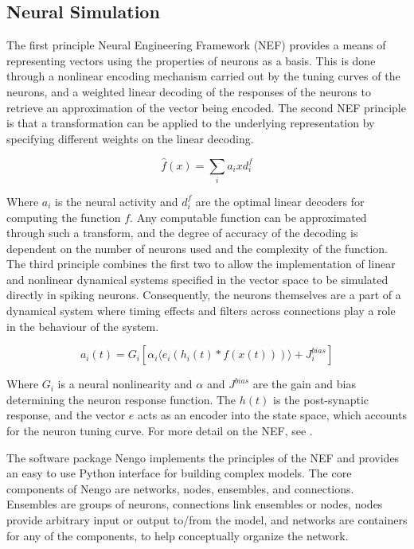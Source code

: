 \documentclass[letterpaper, 10 pt, conference]{ieeeconf}  %
\begin{document}
\subsection{Neural Simulation}

The first principle Neural Engineering Framework (NEF)\cite{eliasmith2004neural} provides a means of representing vectors using the properties of neurons as a basis.
This is done through a nonlinear encoding mechanism carried out by the tuning curves of the neurons, and a weighted linear decoding of the responses of the neurons to retrieve an approximation of the vector being encoded.
The second NEF principle is that a transformation can be applied to the underlying representation by specifying different weights on the linear decoding.%

\begin{equation} \label{eq:SecondPrinciple}
\hat{f}(x) = \sum_{i} a_{i} x d_{i}^{f}
\end{equation}

Where $a_{i}$ is the neural activity and $d_{i}^{f}$ are the optimal linear decoders for computing the function $f$.
Any computable function can be approximated through such a transform, and the degree of accuracy of the decoding is dependent on the number of neurons used and the complexity of the function.
The third principle combines the first two to allow the implementation of linear and nonlinear dynamical systems specified in the vector space to be simulated directly in spiking neurons.
Consequently, the neurons themselves are a part of a dynamical system where timing effects and filters across connections play a role in the behaviour of the system.%

\begin{equation} \label{eq:ThirdPrinciple}
a_i(t) = G_i [ \alpha_i \langle e_i ( h_i(t)  * f(x(t)) ) \rangle + J^{bias}_i ]
\end{equation}

Where $G_{i}$ is a neural nonlinearity and $\alpha$ and $J^{bias}$ are the gain and bias determining the neuron response function. The $h(t)$ is the post-synaptic response, and the vector $e$ acts as an encoder into the state space, which accounts for the neuron tuning curve.
For more detail on the NEF, see \cite{eliasmith2004neural}.%

The software package Nengo \cite{bekolay2013nengo} implements the principles of the NEF and provides an easy to use Python interface for building complex models.
The core components of Nengo are networks, nodes, ensembles, and connections.
Ensembles are groups of neurons, connections link ensembles or nodes, nodes provide arbitrary input or output to/from the model, and networks are containers for any of the components, to help conceptually organize the network.
\end{document}
